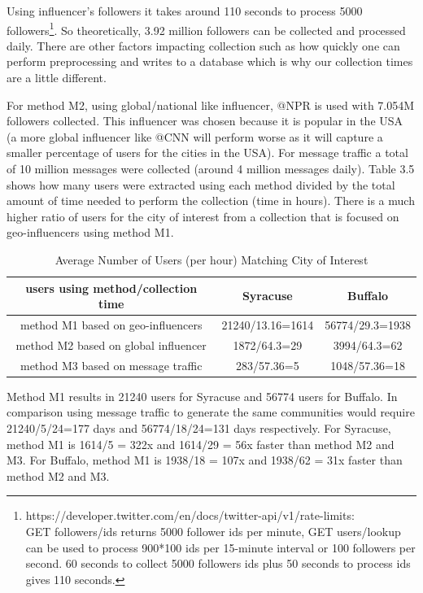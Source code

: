 Using influencer's followers it takes around 110 seconds to process 5000 followers\footnote{https://developer.twitter.com/en/docs/twitter-api/v1/rate-limits:\\GET followers/ids returns 5000 follower ids per minute, GET users/lookup can be used to process 900*100 ids per 15-minute interval or 100 followers per second. 60 seconds to collect 5000 followers ids plus 50 seconds to process ids gives 110 seconds.}. So theoretically, 3.92 million followers can be collected and processed daily. There are other factors impacting collection such as how quickly one can perform preprocessing and writes to a database which is why our collection times are a little different.

For method M2, using global/national like influencer, @NPR is used with 7.054M followers collected. This influencer was chosen because it is popular in the USA (a more global influencer like @CNN will perform worse as it will capture a smaller percentage of users for the cities in the USA). For message traffic a total of 10 million messages were collected (around 4 million messages daily). Table 3.5 shows how many users were extracted using each method divided by the total amount of time needed to perform the collection (time in hours). There is a much higher ratio of users for the city of interest from a collection that is focused on geo-influencers using method M1.

\begin{table}
\small
\renewcommand{\arraystretch}{1.2}
\caption{Average Number of Users (per hour) Matching City of Interest}
\label{table_abbr}
\centering
\begin{tabular}{|c|c|c|}
\hline
\bfseries users using method/collection time & \bfseries Syracuse & \bfseries Buffalo\\
\hline
method M1 based on geo-influencers & 21240/13.16=1614 & 56774/29.3=1938\\
\hline
method M2 based on global influencer & 1872/64.3=29 & 3994/64.3=62\\
\hline
method M3 based on message traffic & 283/57.36=5	 & 1048/57.36=18\\
\hline
\end{tabular}
\end{table}

Method M1 results in 21240 users for Syracuse and 56774 users for Buffalo. In comparison using message traffic to generate the same communities would require 21240/5/24=177 days and 56774/18/24=131 days respectively. For Syracuse, method M1 is 1614/5 = 322x and 1614/29 = 56x faster than method M2 and M3. For Buffalo, method M1 is 1938/18 = 107x and 1938/62 = 31x faster than method M2 and M3.

